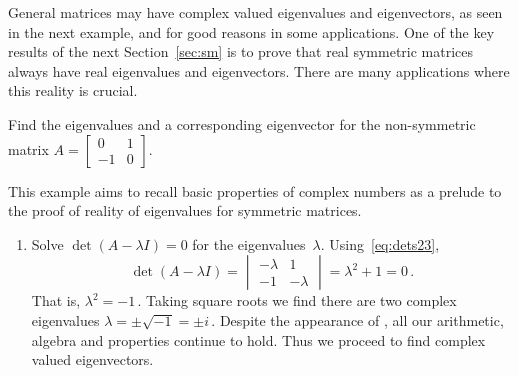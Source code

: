 General matrices may have complex valued eigenvalues and eigenvectors, as seen in the next example, and for good reasons in some applications.
One of the key results of the next Section~\ref{sec:sm} is to prove that real symmetric matrices always have real eigenvalues and eigenvectors.
There are many applications where this reality is crucial.


\begin{example} \label{eg:ccevals}
Find the eigenvalues and a corresponding eigenvector for the non-symmetric matrix \(A=\begin{bmatrix} 0&1\\-1&0 \end{bmatrix}\).
\begin{aside}
This example aims to recall basic properties of complex numbers as a prelude to the proof of reality of eigenvalues for symmetric matrices.  
\end{aside}


\begin{solution} 
\begin{enumerate}
\item Solve \(\det(A-\lambda I)=0\) for the eigenvalues~\(\lambda\).
Using~\eqref{eq:dets23},
\begin{equation*}
\det(A-\lambda I)
=\begin{vmatrix} -\lambda&1\\-1&-\lambda \end{vmatrix}
=\lambda^2+1=0\,.
\end{equation*}
That is, \(\lambda^2=-1\)\,.  
Taking square roots we find there are two complex eigenvalues \(\lambda=\pm\sqrt{-1}=\pm i\)\,.
Despite the appearance of , all our arithmetic, algebra and properties continue to hold.
Thus we proceed to find complex valued eigenvectors.


\end{enumerate}
\end{solution}
\end{example}
